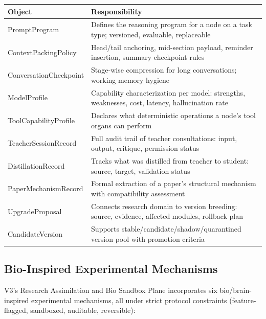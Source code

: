 \documentclass[12pt,a4paper]{article}
\begin{document}
\begin{table}[htbp]
\centering
\small
\begin{tabular}{ll}
\toprule
Object & Responsibility \\
\midrule
PromptProgram & Defines the reasoning program for a node on a task type; versioned, evaluable, replaceable \\
ContextPackingPolicy & Head/tail anchoring, mid-section payload, reminder insertion, summary checkpoint rules \\
ConversationCheckpoint & Stage-wise compression for long conversations; working memory hygiene \\
ModelProfile & Capability characterization per model: strengths, weaknesses, cost, latency, hallucination rate \\
ToolCapabilityProfile & Declares what deterministic operations a node's tool organs can perform \\
TeacherSessionRecord & Full audit trail of teacher consultations: input, output, critique, permission status \\
DistillationRecord & Tracks what was distilled from teacher to student: source, target, validation status \\
PaperMechanismRecord & Formal extraction of a paper's structural mechanism with compatibility assessment \\
UpgradeProposal & Connects research domain to version breeding: source, evidence, affected modules, rollback plan \\
CandidateVersion & Supports stable/candidate/shadow/quarantined version pool with promotion criteria \\
\bottomrule
\end{tabular}
\end{table}


\subsection{Bio-Inspired Experimental Mechanisms}


V3's Research Assimilation and Bio Sandbox Plane incorporates six bio/brain-inspired experimental mechanisms, all under strict protocol constraints (feature-flagged, sandboxed, auditable, reversible):
\end{document}
